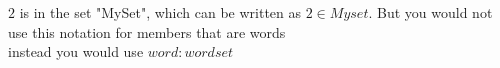 \documentclass[12pt]{article}
\begin{document}
  $2$ is in the set "MySet", which can be written as ${2 \in Myset}$.
  But you would not use this notation for members that are words \\
  instead you would use $word:wordset$
\end{document}
